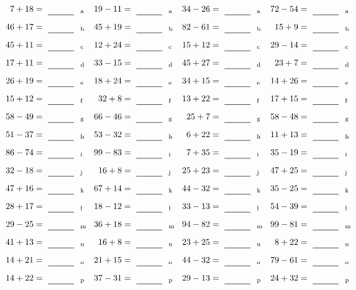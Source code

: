 \documentclass
[
  draft    = true,
  fontsize = 11pt,
  parskip  = half-
]
{scrartcl}
\begin{document}
\clearpage
\begin{align*}
    \pline{7+18}&=\rline{a}
  & \pline{19-11}&=\rline{a}
  & \pline{34-26}&=\rline{a}
  & \pline{72-54}&=\rline{a} \\[1ex]
    \pline{46+17}&=\rline{b}
  & \pline{45+19}&=\rline{b}
  & \pline{82-61}&=\rline{b}
  & \pline{15+9}&=\rline{b} \\[1ex]
    \pline{45+11}&=\rline{c}
  & \pline{12+24}&=\rline{c}
  & \pline{15+12}&=\rline{c}
  & \pline{29-14}&=\rline{c} \\[1ex]
    \pline{17+11}&=\rline{d}
  & \pline{33-15}&=\rline{d}
  & \pline{45+27}&=\rline{d}
  & \pline{23+7}&=\rline{d} \\[1ex]
    \pline{26+19}&=\rline{e}
  & \pline{18+24}&=\rline{e}
  & \pline{34+15}&=\rline{e}
  & \pline{14+26}&=\rline{e} \\[1ex]
    \pline{15+12}&=\rline{f}
  & \pline{32+8}&=\rline{f}
  & \pline{13+22}&=\rline{f}
  & \pline{17+15}&=\rline{f} \\[1ex]
    \pline{58-49}&=\rline{g}
  & \pline{66-46}&=\rline{g}
  & \pline{25+7}&=\rline{g}
  & \pline{58-48}&=\rline{g} \\[1ex]
    \pline{51-37}&=\rline{h}
  & \pline{53-32}&=\rline{h}
  & \pline{6+22}&=\rline{h}
  & \pline{11+13}&=\rline{h} \\[1ex]
    \pline{86-74}&=\rline{i}
  & \pline{99-83}&=\rline{i}
  & \pline{7+35}&=\rline{i}
  & \pline{35-19}&=\rline{i} \\[1ex]
    \pline{32-18}&=\rline{j}
  & \pline{16+8}&=\rline{j}
  & \pline{25+23}&=\rline{j}
  & \pline{47+25}&=\rline{j} \\[1ex]
    \pline{47+16}&=\rline{k}
  & \pline{67+14}&=\rline{k}
  & \pline{44-32}&=\rline{k}
  & \pline{35-25}&=\rline{k} \\[1ex]
    \pline{28+17}&=\rline{l}
  & \pline{18-12}&=\rline{l}
  & \pline{33-13}&=\rline{l}
  & \pline{54-39}&=\rline{l} \\[1ex]
    \pline{29-25}&=\rline{m}
  & \pline{36+18}&=\rline{m}
  & \pline{94-82}&=\rline{m}
  & \pline{99-81}&=\rline{m} \\[1ex]
    \pline{41+13}&=\rline{n}
  & \pline{16+8}&=\rline{n}
  & \pline{23+25}&=\rline{n}
  & \pline{8+22}&=\rline{n} \\[1ex]
    \pline{14+21}&=\rline{o}
  & \pline{21+15}&=\rline{o}
  & \pline{44-32}&=\rline{o}
  & \pline{79-61}&=\rline{o} \\[1ex]
    \pline{14+22}&=\rline{p}
  & \pline{37-31}&=\rline{p}
  & \pline{29-13}&=\rline{p}
  & \pline{24+32}&=\rline{p}
\end{align*}
\end{document}
